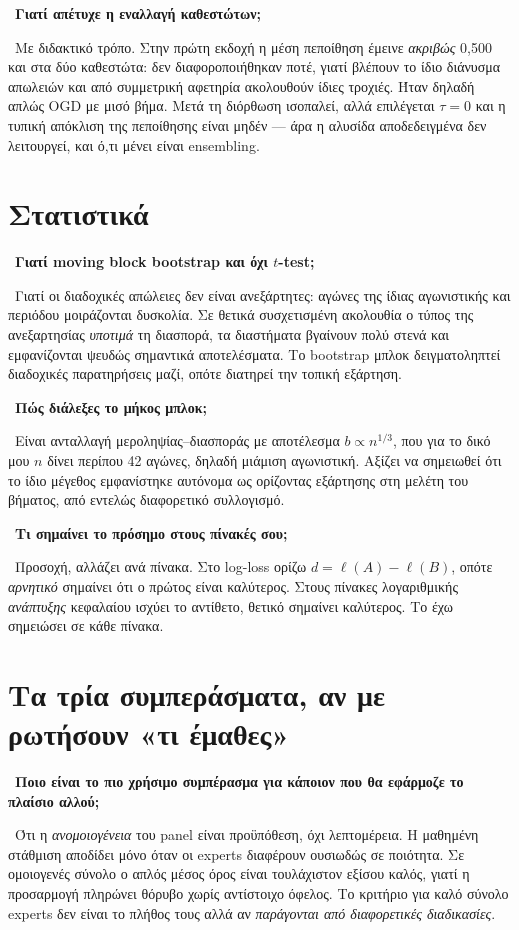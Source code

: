 \documentclass[11pt,a4paper]{article}
\newcommand{\qa}[2]{%
  \par\medskip\noindent{\color{qcol}\textbf{Ε.}}\ \textbf{#1}\par
  \noindent{\color{qcol}\textbf{Α.}}\ #2\par}
\begin{document}
\qa{Γιατί απέτυχε η εναλλαγή καθεστώτων;}
{Με διδακτικό τρόπο. Στην πρώτη εκδοχή η μέση πεποίθηση έμεινε \emph{ακριβώς} 0,500 και στα
δύο καθεστώτα: δεν διαφοροποιήθηκαν ποτέ, γιατί βλέπουν το ίδιο διάνυσμα απωλειών και από
συμμετρική αφετηρία ακολουθούν ίδιες τροχιές. Ήταν δηλαδή απλώς OGD με μισό βήμα. Μετά τη
διόρθωση ισοπαλεί, αλλά επιλέγεται $\tau=0$ και η τυπική απόκλιση της πεποίθησης είναι
μηδέν --- άρα η αλυσίδα αποδεδειγμένα δεν λειτουργεί, και ό,τι μένει είναι ensembling.}

\section{Στατιστικά}

\qa{Γιατί moving block bootstrap και όχι $t$-test;}
{Γιατί οι διαδοχικές απώλειες δεν είναι ανεξάρτητες: αγώνες της ίδιας αγωνιστικής και
περιόδου μοιράζονται δυσκολία. Σε θετικά συσχετισμένη ακολουθία ο τύπος της ανεξαρτησίας
\emph{υποτιμά} τη διασπορά, τα διαστήματα βγαίνουν πολύ στενά και εμφανίζονται ψευδώς
σημαντικά αποτελέσματα. Το bootstrap μπλοκ δειγματοληπτεί διαδοχικές παρατηρήσεις μαζί,
οπότε διατηρεί την τοπική εξάρτηση.}

\qa{Πώς διάλεξες το μήκος μπλοκ;}
{Είναι ανταλλαγή μεροληψίας--διασποράς με αποτέλεσμα $b\propto n^{1/3}$, που για το δικό μου
$n$ δίνει περίπου 42 αγώνες, δηλαδή μιάμιση αγωνιστική. Αξίζει να σημειωθεί ότι το ίδιο
μέγεθος εμφανίστηκε αυτόνομα ως ορίζοντας εξάρτησης στη μελέτη του βήματος, από εντελώς
διαφορετικό συλλογισμό.}

\qa{Τι σημαίνει το πρόσημο στους πίνακές σου;}
{Προσοχή, αλλάζει ανά πίνακα. Στο log-loss ορίζω $d=\ell(A)-\ell(B)$, οπότε \emph{αρνητικό}
σημαίνει ότι ο πρώτος είναι καλύτερος. Στους πίνακες λογαριθμικής \emph{ανάπτυξης} κεφαλαίου
ισχύει το αντίθετο, θετικό σημαίνει καλύτερος. Το έχω σημειώσει σε κάθε πίνακα.}

\section{Τα τρία συμπεράσματα, αν με ρωτήσουν «τι έμαθες»}

\qa{Ποιο είναι το πιο χρήσιμο συμπέρασμα για κάποιον που θα εφάρμοζε το πλαίσιο αλλού;}
{Ότι η \emph{ανομοιογένεια} του panel είναι προϋπόθεση, όχι λεπτομέρεια. Η μαθημένη στάθμιση
αποδίδει μόνο όταν οι experts διαφέρουν ουσιωδώς σε ποιότητα. Σε ομοιογενές σύνολο ο απλός
μέσος όρος είναι τουλάχιστον εξίσου καλός, γιατί η προσαρμογή πληρώνει θόρυβο χωρίς
αντίστοιχο όφελος. Το κριτήριο για καλό σύνολο experts δεν είναι το πλήθος τους αλλά αν
\emph{παράγονται από διαφορετικές διαδικασίες}.}
\end{document}
